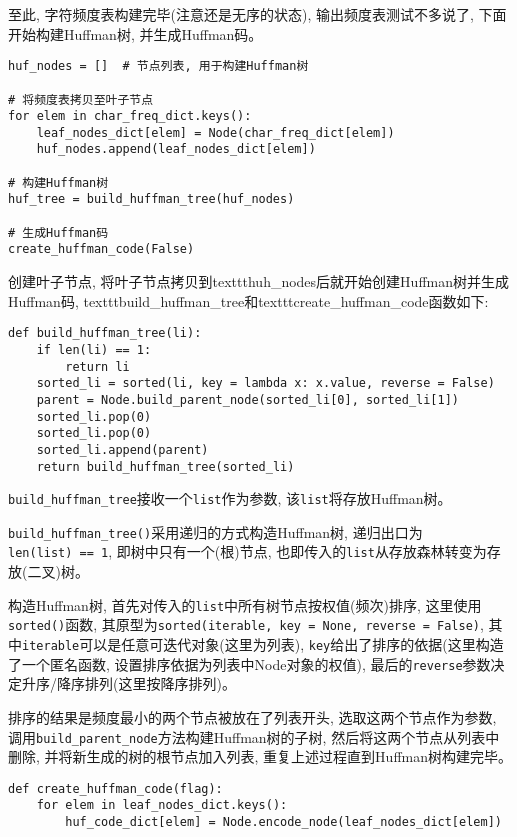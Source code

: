 \documentclass[a4paper]{ctexart}
\begin{document}
至此, 字符频度表构建完毕(注意还是无序的状态), 输出频度表测试不多说了, 下面开始构建Huffman树, 并生成Huffman码。

{\setmainfont{Courier New Bold}              
\begin{lstlisting}
huf_nodes = []  # 节点列表, 用于构建Huffman树

# 将频度表拷贝至叶子节点
for elem in char_freq_dict.keys():
    leaf_nodes_dict[elem] = Node(char_freq_dict[elem])
    huf_nodes.append(leaf_nodes_dict[elem])

# 构建Huffman树
huf_tree = build_huffman_tree(huf_nodes)

# 生成Huffman码
create_huffman_code(False)
\end{lstlisting}}

创建叶子节点, 将叶子节点拷贝到texttt{huh\_nodes}后就开始创建Huffman树并生成Huffman码,
texttt{build\_huffman\_tree}和texttt{create\_huffman\_code}函数如下:

{\setmainfont{Courier New Bold}              
\begin{lstlisting}
def build_huffman_tree(li):
    if len(li) == 1:
        return li
    sorted_li = sorted(li, key = lambda x: x.value, reverse = False)
    parent = Node.build_parent_node(sorted_li[0], sorted_li[1])
    sorted_li.pop(0)
    sorted_li.pop(0)
    sorted_li.append(parent)
    return build_huffman_tree(sorted_li)
\end{lstlisting}}

\texttt{build\_huffman\_tree}接收一个\texttt{list}作为参数, 该\texttt{list}将存放Huffman树。

\texttt{build\_huffman\_tree()}采用递归的方式构造Huffman树, 递归出口为\texttt{len(list)\ ==\ 1}, 即树中只有一个(根)节点, 也即传入的\texttt{list}从存放森林转变为存放(二叉)树。

构造Huffman树, 首先对传入的\texttt{list}中所有树节点按权值(频次)排序, 这里使用\texttt{sorted()}函数,
其原型为\texttt{sorted(iterable,\ key\ =\ None,\ reverse\ =\ False)}, 其中\texttt{iterable}可以是任意可迭代对象(这里为列表), \texttt{key}给出了排序的依据(这里构造了一个匿名函数, 设置排序依据为列表中Node对象的权值), 最后的\texttt{reverse}参数决定升序/降序排列(这里按降序排列)。

排序的结果是频度最小的两个节点被放在了列表开头, 选取这两个节点作为参数, 调用\texttt{build\_parent\_node}方法构建Huffman树的子树, 然后将这两个节点从列表中删除, 并将新生成的树的根节点加入列表, 重复上述过程直到Huffman树构建完毕。

{\setmainfont{Courier New Bold}              
\begin{lstlisting}
def create_huffman_code(flag):
    for elem in leaf_nodes_dict.keys():
        huf_code_dict[elem] = Node.encode_node(leaf_nodes_dict[elem])
\end{lstlisting}}
\end{document}
